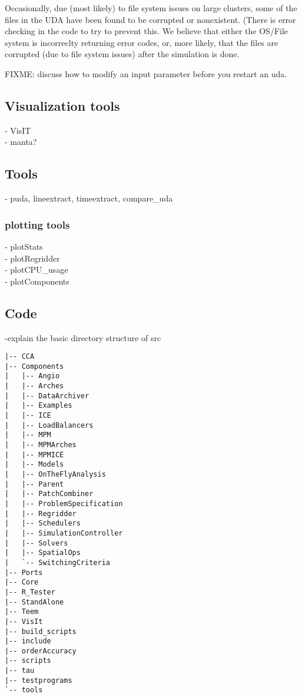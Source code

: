 
Occasionally, due (most likely) to file system issues on large
clusters, some of the files in the UDA have been found to be corrupted
or nonexistent.  (There is error checking in the code to try to
prevent this.  We believe that either the OS/File system is
incorreclty returning error codes, or, more likely, that the files are
corrupted (due to file system issues) after the simulation is done.


FIXME: discuss how to modify an input parameter before you restart an uda.

\subsection{Visualization tools}
- VisIT\\
- manta?

\subsection{Tools}
- puda, lineextract, timeextract, compare\_uda\\

\subsubsection{plotting tools}
- plotStats\\
- plotRegridder \\
- plotCPU\_usage \\
- plotComponents

\subsection{Code}
-explain the basic directory structure of src
\begin{Verbatim}[fontsize=\footnotesize]
|-- CCA
|-- Components
|   |-- Angio
|   |-- Arches
|   |-- DataArchiver
|   |-- Examples
|   |-- ICE
|   |-- LoadBalancers
|   |-- MPM
|   |-- MPMArches
|   |-- MPMICE
|   |-- Models
|   |-- OnTheFlyAnalysis
|   |-- Parent
|   |-- PatchCombiner
|   |-- ProblemSpecification
|   |-- Regridder
|   |-- Schedulers
|   |-- SimulationController
|   |-- Solvers
|   |-- SpatialOps
|   `-- SwitchingCriteria
|-- Ports
|-- Core
|-- R_Tester
|-- StandAlone
|-- Teem
|-- VisIt
|-- build_scripts
|-- include
|-- orderAccuracy
|-- scripts
|-- tau
|-- testprograms
`-- tools
\end{Verbatim}
